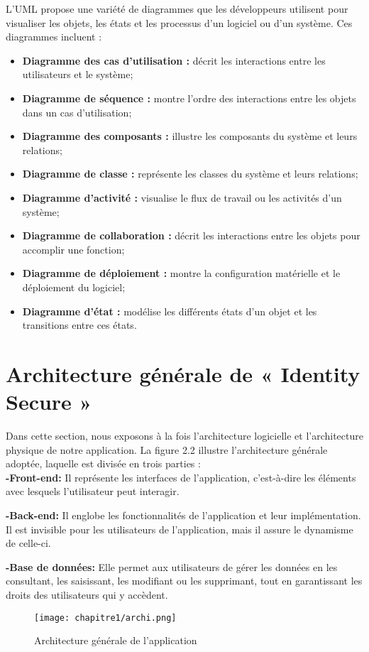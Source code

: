 L'UML propose une variété de diagrammes que les développeurs utilisent pour visualiser les objets, les états et les processus d'un logiciel ou d'un système. Ces diagrammes incluent :
\begin{itemize}
    \item \textbf{Diagramme des cas d'utilisation :} décrit les interactions entre les utilisateurs et le système;
    \item \textbf{Diagramme de séquence :} montre l'ordre des interactions entre les objets dans un cas d'utilisation;
    \item \textbf{Diagramme des composants :} illustre les composants du système et leurs relations;
    \item \textbf{Diagramme de classe :} représente les classes du système et leurs relations;
    \item \textbf{Diagramme d'activité :} visualise le flux de travail ou les activités d'un système;
    \item \textbf{Diagramme de collaboration :} décrit les interactions entre les objets pour accomplir une fonction;
    \item \textbf{Diagramme de déploiement :} montre la configuration matérielle et le déploiement du logiciel;
    \item \textbf{Diagramme d'état :} modélise les différents états d'un objet et les transitions entre ces états.
\end{itemize}





\section{Architecture générale de « \textbf{Identity Secure} »}
Dans cette section, nous exposons à la fois l'architecture logicielle et l'architecture physique de notre application. La figure 2.2 illustre l'architecture générale adoptée, laquelle est divisée en trois parties :\\

\textbf{-Front-end:} Il représente les interfaces de l'application, c'est-à-dire les éléments avec lesquels l'utilisateur peut interagir.

\textbf{-Back-end:} Il englobe les fonctionnalités de l'application et leur implémentation. Il est invisible pour les utilisateurs de l'application, mais il assure le dynamisme de celle-ci.

\textbf{-Base de données:} Elle permet aux utilisateurs de gérer les données en les consultant, les saisissant, les modifiant ou les supprimant, tout en garantissant les droits des utilisateurs qui y accèdent.
\begin{figure}[H]
\centering

\texttt{[image: chapitre1/archi.png]}
\caption{ Architecture générale de l'application}
\end{figure}

